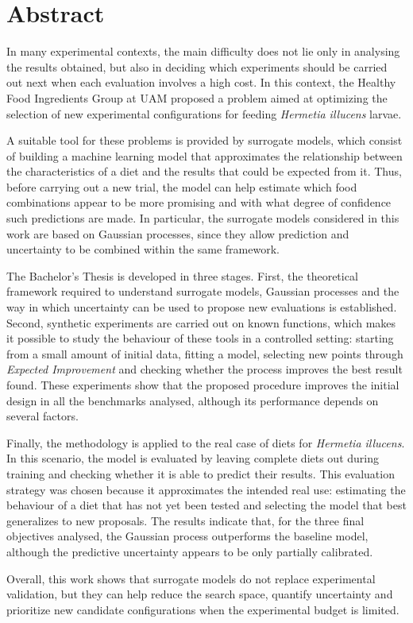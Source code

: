 \chapter*{Abstract}

In many experimental contexts, the main difficulty does not lie only in analysing the results obtained, but also in deciding which experiments should be carried out next when each evaluation involves a high cost.
In this context, the Healthy Food Ingredients Group at UAM proposed a problem aimed at optimizing the selection of new experimental configurations for feeding \textit{Hermetia illucens} larvae.

A suitable tool for these problems is provided by surrogate models, which consist of building a machine learning model that approximates the relationship between the characteristics of a diet and the results that could be expected from it.
Thus, before carrying out a new trial, the model can help estimate which food combinations appear to be more promising and with what degree of confidence such predictions are made. In particular, the surrogate models considered in this work are based on Gaussian processes, since they allow prediction and uncertainty to be combined within the same framework.

The Bachelor's Thesis is developed in three stages. First, the theoretical framework required to understand surrogate models, Gaussian processes and the way in which uncertainty can be used to propose new evaluations is established.
Second, synthetic experiments are carried out on known functions, which makes it possible to study the behaviour of these tools in a controlled setting: starting from a small amount of initial data, fitting a model, selecting new points through \textit{Expected Improvement} and checking whether the process improves the best result found.
These experiments show that the proposed procedure improves the initial design in all the benchmarks analysed, although its performance depends on several factors.

Finally, the methodology is applied to the real case of diets for \textit{Hermetia illucens}. In this scenario, the model is evaluated by leaving complete diets out during training and checking whether it is able to predict their results. This evaluation strategy was chosen because it approximates the intended real use: estimating the behaviour of a diet that has not yet been tested and selecting the model that best generalizes to new proposals. The results indicate that, for the three final objectives analysed, the Gaussian process outperforms the baseline model, although the predictive uncertainty appears to be only partially calibrated.

Overall, this work shows that surrogate models do not replace experimental validation, but they can help reduce the search space, quantify uncertainty and prioritize new candidate configurations when the experimental budget is limited.

